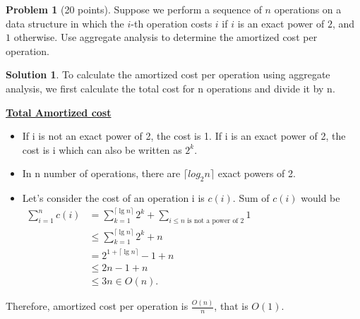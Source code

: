 \documentclass{article}
\theoremstyle{definition}
\newtheorem{problem}{Problem}
\newtheorem*{solution}{Solution}
\begin{document}
\begin{problem}[20 points] \label{base}
  Suppose we perform a sequence of $n$ operations on a data structure
  in which the $i$-th operation costs $i$ if $i$ is an exact power of
  $2$, and $1$ otherwise. Use aggregate analysis to determine the
  amortized cost per operation.
\end{problem}
\begin{solution}
To calculate the amortized cost per operation using aggregate analysis, we first calculate the total cost for n operations and divide it by n.
\bigbreak

\textbf{\underline{Total Amortized cost}}
\begin{itemize}
    \item If i is not an exact power of 2, the cost is 1. If i is an exact power of 2, the cost is i which can also be written as $2^k$.
    \item In n number of operations, there are $\lceil log_2n \rceil$ exact powers of 2.
    \item Let's consider the cost of an operation i is $c(i)$. Sum of $c(i)$ would be
    $\begin{aligned} \sum_{i=1}^n c(i) & =\sum_{k=1}^{\lceil\lg n\rceil} 2^k+\sum_{i \leq n \text { is not a power of } 2} 1 \\ & \leq \sum_{k=1}^{\lceil\lg n\rceil} 2^k+n \\ & =2^{1+\lceil\lg n\rceil}-1+n \\ & \leq 2 n-1+n \\ & \leq 3 n \in O(n) .\end{aligned}$
\end{itemize}
Therefore, amortized cost per operation is $\frac{O(n)}{n}$, that is $O(1)$.
\end{solution}
\newpage
\end{document}

